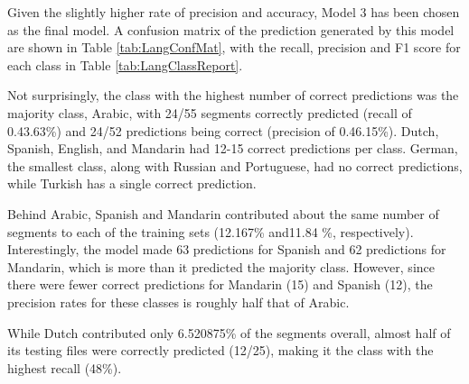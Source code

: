 Given the slightly higher rate of precision and accuracy, Model 3 has been chosen as the final model. A confusion matrix of the prediction generated by this model are shown in Table \ref{tab:LangConfMat}, with the recall, precision and F1 score for each class in Table \ref{tab:LangClassReport}.

Not surprisingly, the class with the highest number of correct predictions was the majority class, Arabic, with 24/55 segments correctly predicted (recall of 0.43.63\%) and 24/52 predictions being correct (precision of 0.46.15\%). Dutch, Spanish, English, and Mandarin had 12-15 correct predictions per class. German, the smallest class, along with Russian and Portuguese, had no correct predictions, while Turkish has a single correct prediction.

Behind Arabic, Spanish and Mandarin contributed about the same number of segments to each of the training sets (12.167\% and11.84 \%, respectively). Interestingly, the model made 63 predictions for Spanish and 62 predictions  for Mandarin, which is more than it predicted the majority class. However, since there were fewer correct predictions for Mandarin (15) and Spanish (12), the precision rates for these classes is roughly half that of Arabic.

While Dutch contributed only 6.520875\% of the segments overall, almost half of its testing files were correctly predicted (12/25), making it the class with the highest recall (48\%).

